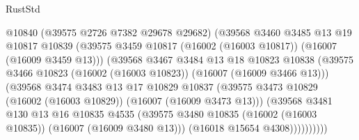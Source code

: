 \begin{lexlean}{RustStd}
\begin{coremodule}
                                    @10840
                                    (@39575 @2726 @7382 @29678 @29682)
                                    (@39568
                                      @3460
                                      @3485
                                      @13
                                      @19
                                      @10817
                                      @10839
                                      (@39575
                                        @3459
                                        @10817
                                        (@16002 (@16003 @10817))
                                        (@16007 (@16009 @3459 @13)))
                                      (@39568
                                        @3467
                                        @3484
                                        @13
                                        @18
                                        @10823
                                        @10838
                                        (@39575
                                          @3466
                                          @10823
                                          (@16002 (@16003 @10823))
                                          (@16007 (@16009 @3466 @13)))
                                        (@39568
                                          @3474
                                          @3483
                                          @13
                                          @17
                                          @10829
                                          @10837
                                          (@39575
                                            @3473
                                            @10829
                                            (@16002 (@16003 @10829))
                                            (@16007 (@16009 @3473 @13)))
                                          (@39568
                                            @3481
                                            @130
                                            @13
                                            @16
                                            @10835
                                            @4535
                                            (@39575
                                              @3480
                                              @10835
                                              (@16002 (@16003 @10835))
                                              (@16007 (@16009 @3480 @13)))
                                            (@16018 @15654 @4308))))))))))

\end{coremodule}
\end{lexlean}
